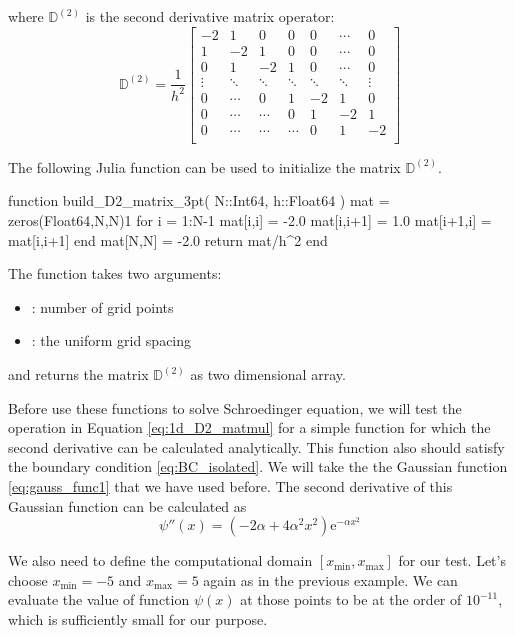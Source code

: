 where $\mathbb{D}^{(2)}$ is the second derivative matrix operator:
%
\begin{equation}
\mathbb{D}^{(2)} = \frac{1}{h^2}
\begin{bmatrix}
-2  &  1  &  0  &  0  & 0 & \cdots & 0 \\
 1  & -2  &  1  &  0  & 0 & \cdots & 0 \\
 0  &  1  & -2  &  1  & 0 & \cdots & 0 \\
 \vdots  &  \ddots  &  \ddots  & \ddots  & \ddots  & \ddots & \vdots \\
 0 & \cdots & 0 & 1 & -2 & 1 & 0 \\
 0  &  \cdots  & \cdots & 0  & 1  & -2  & 1 \\
 0  &  \cdots  & \cdots & \cdots & 0  &  1  & -2 \\
\end{bmatrix}
\label{eq:1d_D2_matmul}
\end{equation}

The following Julia function can be used to initialize the matrix $\mathbb{D}^{(2)}$.
\begin{juliacode}
function build_D2_matrix_3pt( N::Int64, h::Float64 )
  mat = zeros(Float64,N,N)1
  for i = 1:N-1
    mat[i,i] = -2.0
    mat[i,i+1] = 1.0
    mat[i+1,i] = mat[i,i+1]
  end
  mat[N,N] = -2.0
  return mat/h^2
end
\end{juliacode}
The function  takes two arguments:
\begin{itemize}
\item {}: number of grid points
\item {}: the uniform grid spacing
\end{itemize}
and returns the matrix $\mathbb{D}^{(2)}$ as two dimensional array.

Before use these functions to solve Schroedinger equation, we will test the operation
in Equation \eqref{eq:1d_D2_matmul} for a simple function for which the second derivative
can be calculated analytically. This function also should satisfy the boundary condition
\ref{eq:BC_isolated}. We will take the the Gaussian function
\eqref{eq:gauss_func1} that we have used before.
The second derivative of this Gaussian function can be calculated as
%
\begin{equation}
\psi''(x) = \left( -2 \alpha + 4\alpha^2 x^2 \right) \mathrm{e}^{-\alpha x^2}
\end{equation}

We also need to define the computational domain
$[x_{\text{min}},x_{\text{max}}]$ for our test.
Let's choose $x_{\text{min}} = -5$ and $x_{\text{max}} = 5$ again as in the previous example.
We can evaluate the value of function $\psi({x})$ at those points to be at the
order of $10^{-11}$, which is sufficiently small for our purpose.

